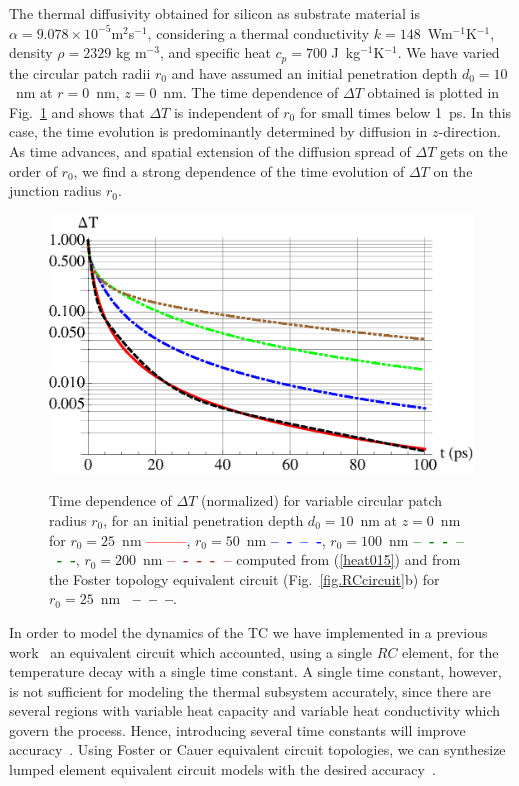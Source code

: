 \documentclass[journal]{IEEEtran}
\begin{document}
%
The thermal diffusivity obtained for silicon as substrate material is $\alpha=9.078\times10^{-5}$m$^2$s$^{-1}$, considering a thermal conductivity $k=148$~Wm$^{-1}$K$^{-1}$, density $\rho=2329$ kg m$^{-3}$, and specific heat $c_p=700$ J~kg$^{-1}$K$^{-1}$. We have varied the circular patch radii $r_0$ and have assumed an initial penetration depth $d_0=10$~nm at $r=0$~nm, $z=0$~nm. The time dependence of $\Delta T$ obtained is plotted in Fig.~\ref{product02c1} and shows that $\Delta T$ is independent of $r_0$ for small times below 1~ps. In this case, the time evolution is predominantly determined by diffusion in $z$-direction. As time advances, and spatial extension of the diffusion spread of $\Delta T$ gets on the order of $r_0$, we find a strong dependence of the time evolution of $\Delta T$ on the junction radius $r_0$.

%
\begin{figure}[h]
\centering
\includegraphics[width=1\columnwidth,clip]{figures/product02c1newn2.eps} \\
\caption{Time dependence of $\Delta T$ (normalized) for variable  circular patch radius $r_0 $, %
for an initial penetration depth $d_0=10$~nm at $z=0$~nm for $r_0=25$~nm
\textcolor{red}{\bf --------}, $r_0=50$~nm \textcolor{blue}{\bf --~-~--~-}, $r_0=100$~nm \textcolor{green}{\bf --~-~-~--~-~-},   $r_0=200$~nm \textcolor{brown}{\bf --~-~-~-~--} computed from (\ref{heat015})  and from the Foster topology equivalent circuit (Fig.~\ref{fig.RCcircuit}b) for $r_0=25$~nm \textcolor{black}{\bf ~--~--~--}.} 
\label{product02c1}
\end{figure}
%
In order to model the dynamics of the TC we have implemented in a previous work~\cite{szakmany_nano-antenna_2014} an equivalent circuit which accounted, using a single $RC$ element, for the temperature decay with a single time constant. A single time constant, however, is not sufficient for modeling the thermal subsystem accurately, since there are several regions with variable heat capacity and variable heat conductivity which govern the process. Hence, introducing several time constants will improve accuracy~\cite{szekely_evaluation_1997}. Using Foster or Cauer equivalent circuit topologies, we can synthesize lumped element equivalent circuit models with the desired accuracy~\cite{szekely_fine_1988, gerstenmaier_combination_2007}.
\end{document}
